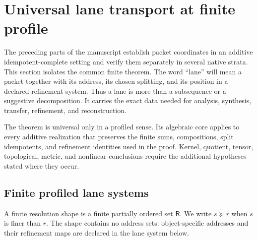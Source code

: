\clearpage
\section{Universal lane transport at finite profile}
\label{sec:block15-universal-lane-transport}

The preceding parts of the manuscript establish packet coordinates in an
additive idempotent-complete setting and verify them separately in several
native strata.  This section isolates the common finite theorem.  The word
``lane'' will mean a packet together with its address, its chosen splitting,
and its position in a declared refinement system.  Thus a lane is more than a
subsequence or a suggestive decomposition.  It carries the exact data needed
for analysis, synthesis, transfer, refinement, and reconstruction.

The theorem is universal only in a profiled sense.  Its algebraic core applies
to every additive realization that preserves the finite sums, compositions,
split idempotents, and refinement identities used in the proof.  Kernel,
quotient, tensor, topological, metric, and nonlinear conclusions require the
additional hypotheses stated where they occur.

\subsection{Finite profiled lane systems}
\label{subsec:block15-lane-systems}

\begin{definition}
\label{def:block15-resolution-diagram}
A finite resolution shape is a finite partially ordered set
\(\mathsf R\).  We write \(s\succeq r\) when \(s\) is finer than \(r\).
The shape contains no address sets: object-specific addresses and their
refinement maps are declared in the lane system below.
\end{definition}

